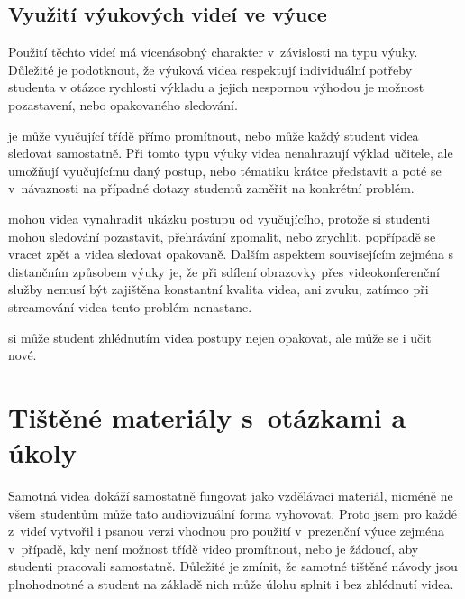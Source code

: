 \subsection{Využití výukových videí ve výuce}
Použití těchto videí má vícenásobný charakter v~závislosti na typu výuky. 
Důležité je podotknout, že výuková videa respektují individuální potřeby studenta v otázce rychlosti výkladu a jejich nespornou výhodou je možnost pozastavení, nebo opakovaného sledování.

\noindent{} je může vyučující třídě přímo promítnout, nebo může každý student videa sledovat samostatně. Při tomto typu výuky videa nenahrazují výklad učitele, ale umožňují vyučujícímu daný postup, nebo tématiku krátce představit a poté se v~návaznosti na případné dotazy studentů zaměřit na konkrétní problém.

\noindent{} mohou videa vynahradit ukázku postupu od vyučujícího, protože si studenti mohou sledování pozastavit, přehrávání zpomalit, nebo zrychlit, popřípadě se vracet zpět a videa sledovat opakovaně. 
Dalším aspektem souvisejícím zejména s distančním způsobem výuky je, že při sdílení obrazovky přes videokonferenční služby nemusí být zajištěna konstantní kvalita videa, ani zvuku, zatímco při streamování videa tento problém nenastane. 

\noindent{} si může student zhlédnutím videa postupy nejen opakovat, ale může se i učit nové. 

\section{Tištěné materiály s~otázkami a úkoly}
Samotná videa dokáží samostatně fungovat jako vzdělávací materiál, nicméně ne všem studentům může tato audiovizuální forma vyhovovat.
Proto jsem pro každé z~videí vytvořil i psanou verzi vhodnou pro použití v~prezenční výuce zejména v~případě, kdy není možnost třídě video promítnout, nebo je žádoucí, aby studenti pracovali samostatně. 
Důležité je zmínit, že samotné tištěné návody jsou plnohodnotné a student na základě nich může úlohu splnit i bez zhlédnutí videa. 

